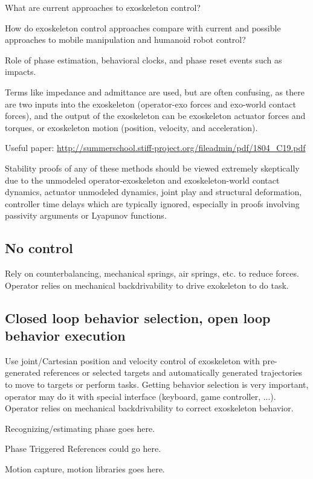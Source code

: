 \documentclass[letterpaper,12pt,fullpage]{article}
\begin{document}
What are current approaches to exoskeleton control?

How do exoskeleton control approaches compare with current and
possible approaches to mobile manipulation and humanoid robot control?

Role of phase estimation, behavioral clocks, and phase reset events
such as impacts.

Terms like impedance and admittance are used, but are often confusing,
as there are two inputs into the exoskeleton (operator-exo forces and
exo-world contact forces), and the output of the
exoskeleton can be exoskeleton actuator forces and torques, or exoskeleton
motion (position, velocity, and acceleration).

Useful paper: \url{http://summerschool.stiff-project.org/fileadmin/pdf/1804_C19.pdf}

Stability proofs of any of these methods should be viewed extremely skeptically due
to the unmodeled operator-exoskeleton and exoskeleton-world contact dynamics, 
actuator unmodeled dynamics, joint play and structural deformation, controller
time delays which are typically ignored, especially in proofs involving
passivity arguments or Lyapunov functions.

\subsection{No control}

Rely on counterbalancing, mechanical springs, air springs, etc.
to reduce forces. 
Operator relies on mechanical backdrivability to drive
exokeleton to do task.

\subsection{Closed loop behavior selection, open loop behavior
execution}

Use joint/Cartesian position and velocity control of exoskeleton 
with pre-generated references or selected targets and automatically generated trajectories to move to targets or perform tasks.
Getting behavior selection is very important, operator may do it with
special interface (keyboard, game controller, ...).
Operator relies on mechanical backdrivability to correct exoskeleton behavior.

Recognizing/estimating phase goes here.

Phase Triggered References could go here.

Motion capture, motion libraries goes here.
\end{document}
